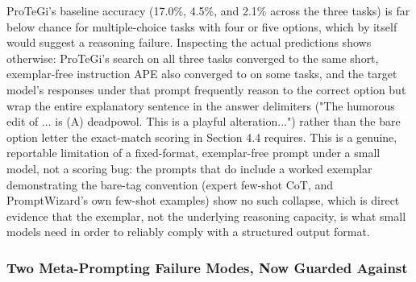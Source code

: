 \documentclass[a4paper,fleqn]{cas-sc}
\begin{document}
ProTeGi's baseline accuracy (17.0\%, 4.5\%, and 2.1\% across the three tasks) is far below chance for multiple-choice tasks with four or five options, which by itself would suggest a reasoning failure. Inspecting the actual predictions shows otherwise: ProTeGi's search on all three tasks converged to the same short, exemplar-free instruction APE also converged to on some tasks, and the target model's responses under that prompt frequently reason to the correct option but wrap the entire explanatory sentence in the answer delimiters ("The humorous edit of ... is (A) deadpowol. This is a playful alteration...") rather than the bare option letter the exact-match scoring in Section 4.4 requires. This is a genuine, reportable limitation of a fixed-format, exemplar-free prompt under a small model, not a scoring bug: the prompts that do include a worked exemplar demonstrating the bare-tag convention (expert few-shot CoT, and PromptWizard's own few-shot examples) show no such collapse, which is direct evidence that the exemplar, not the underlying reasoning capacity, is what small models need in order to reliably comply with a structured output format.

\subsubsection{Two Meta-Prompting Failure Modes, Now Guarded Against}
\end{document}
